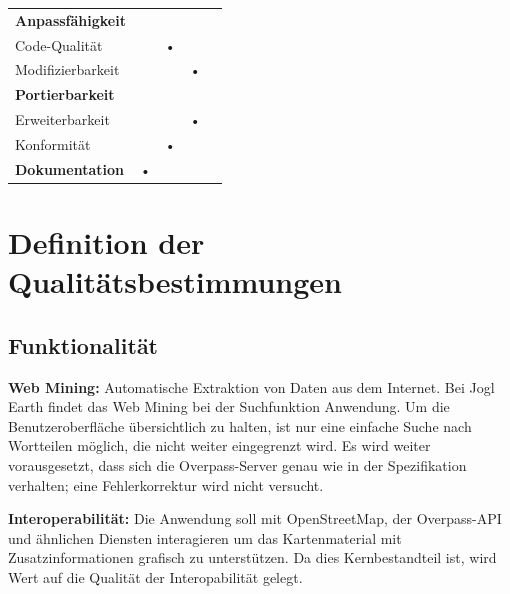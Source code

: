 \documentclass[10pt]{scrreprt}
\newenvironment{indents}{%
  \parskip6pt \parindent5mm \raggedright%
  \def\item{\hangindent=5mm \hangafter1}}{%
  \par\ignorespaces}
\begin{document}
\begin{center}
\begin{tabular}{lcccc}
\hline 
\rule[-1ex]{0pt}{4ex} \textbf{Anpassfähigkeit} &  &  &  &  \\ 
\rule[-1ex]{0pt}{4ex} \hspace{10pt} Code-Qualität & & • & & \\ 
\rule[-1ex]{0pt}{4ex} \hspace{10pt} Modifizierbarkeit & & & • & \\ 

\hline 
\rule[-1ex]{0pt}{4ex} \textbf{Portierbarkeit} &  &  &  &  \\ 
\rule[-1ex]{0pt}{4ex} \hspace{10pt} Erweiterbarkeit & & & • & \\ 
\rule[-1ex]{0pt}{4ex} \hspace{10pt} Konformität & & • & & \\ 

\hline 
\rule[-1ex]{0pt}{4ex} \textbf{Dokumentation} & • & & & \\ 
\hline 
\end{tabular} 
\end{center}

\pagebreak



\section{Definition der Qualitätsbestimmungen}
\subsection*{Funktionalität}
\begin{indents}
\item \textbf{Web Mining:} Automatische Extraktion von Daten aus dem Internet. Bei Jogl Earth findet das Web Mining bei der Suchfunktion Anwendung. Um die Benutzeroberfläche übersichtlich zu halten, ist nur eine einfache Suche nach Wortteilen möglich, die nicht weiter eingegrenzt wird. Es wird weiter vorausgesetzt, dass sich die Overpass-Server genau wie in der Spezifikation verhalten; eine Fehlerkorrektur wird nicht versucht.

\item \textbf{Interoperabilität:} Die Anwendung soll mit OpenStreetMap, der Overpass-API und ähnlichen Diensten interagieren um das Kartenmaterial mit Zusatzinformationen grafisch zu unterstützen. Da dies Kernbestandteil ist, wird Wert auf die Qualität der Interopabilität gelegt.
\end{indents}
\end{document}
